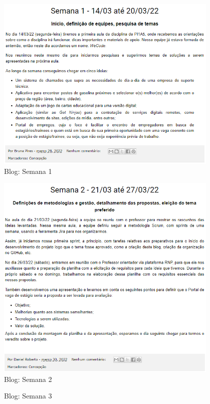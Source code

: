 \begin{apendicesenv}
\begin{figure}[H]
	\centering
	\caption{Blog: Semana 1}
	\includegraphics[width=0.95\textwidth]{../imagens/blog-posts/semana01.png}
\end{figure}
\begin{figure}[H]
	\centering
	\caption{Blog: Semana 2}
	\includegraphics[width=0.95\textwidth]{../imagens/blog-posts/semana02.png}
\end{figure}
\begin{figure}[H]
	\centering
	\caption{Blog: Semana 3}

\end{figure}
\end{apendicesenv}
